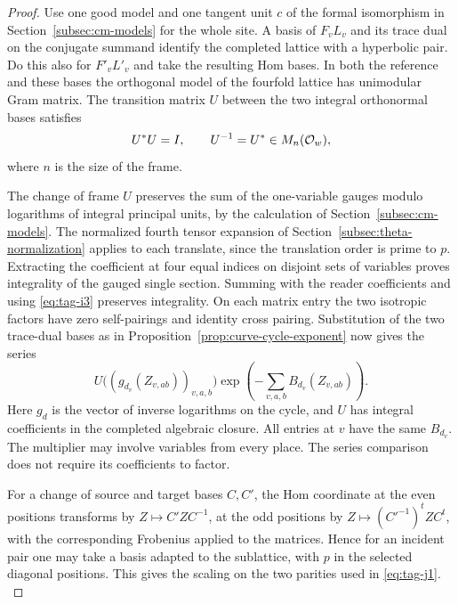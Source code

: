 \begin{proof}

Use one good model and one tangent unit \(c\) of the
formal isomorphism in Section~\ref{subsec:cm-models} for the
whole site. A basis of \(F_vL_v\) and its trace dual on the
conjugate summand identify the completed lattice with a
hyperbolic pair. Do this also for \(F'_vL'_v\) and take the
resulting Hom bases. In both the reference and these bases the
orthogonal model of the fourfold lattice has unimodular Gram
matrix. The transition matrix \(U\) between the two integral orthonormal bases satisfies
\[
  U^*U=I,\qquad U^{-1}=U^*\in M_n({\cal O}_w),
\]
where \(n\) is the size of the frame.

The change of frame \(U\) preserves the sum of the one-variable gauges modulo logarithms of integral principal units, by the
calculation of Section~\ref{subsec:cm-models}. The normalized
fourth tensor expansion of Section~\ref{subsec:theta-normalization}
applies to each translate, since the translation order is prime
to \(p\). Extracting the coefficient at four equal indices on
disjoint sets of variables proves integrality of the gauged
single section. Summing with the reader coefficients and using
\eqref{eq:tag-i3} preserves integrality. On each matrix entry the two
isotropic factors have zero self-pairings and identity cross
pairing. Substitution of the two trace-dual bases as in
Proposition~\ref{prop:curve-cycle-exponent} now gives the series
\[
    U\big((g_{d_v}(Z_{v,ab}))_{v,a,b}\big)
    \exp\left(-\sum_{v,a,b} B_{d_v}(Z_{v,ab})\right).
 \tag{I4}\label{eq:tag-i4}
\]
Here \(g_d\) is the vector of inverse logarithms on the cycle,
and \(U\) has integral coefficients in the completed algebraic
closure. All entries at \(v\) have the same \(B_{d_v}\).
The multiplier may involve variables from every place. The
series comparison does not require its coefficients to factor.

For a change of source and target bases \(C,C'\), the Hom
coordinate at the even positions transforms by
\(Z\mapsto C'ZC^{-1}\), at the odd positions by
\(Z\mapsto(C'^{-1})^t Z C^t\), with the corresponding
Frobenius applied to the matrices. Hence for an incident pair
one may take a basis adapted to the sublattice, with \(p\) in
the selected diagonal positions. This gives the scaling on the
two parities used in \eqref{eq:tag-j1}. \label{cor:incident-sections-2}

\end{proof}

